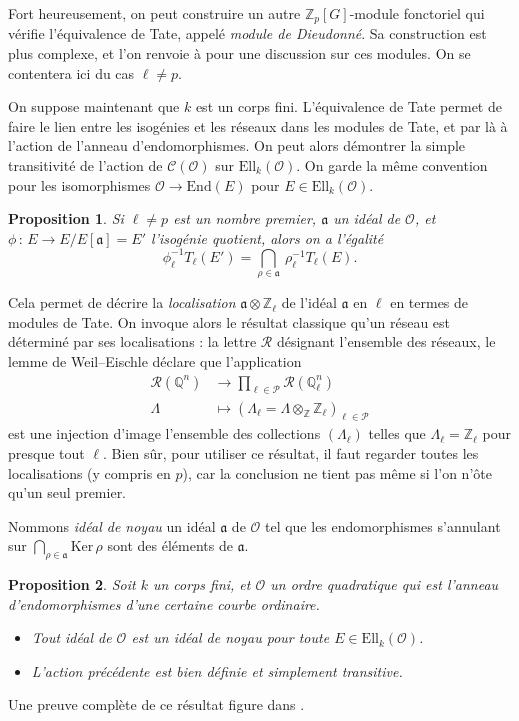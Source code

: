 \documentclass[11pt,a4paper]{article}
\newcommand{\Z}{\mathbb{Z}}
\newcommand{\Q}{\mathbb{Q}}
\renewcommand{\O}{\mathcal{O}}
\newcommand{\Cl}{\mathcal{C}}
\newcommand{\vers}{\longrightarrow}
\newcommand{\End}{\mathrm{End}}
\newcommand{\Ell}{\mathrm{Ell}}
\newcommand{\Ker}{\mathrm{Ker}\,}
\renewcommand{\frak}{\mathfrak}
\newcommand{\de}{\,:\,}
\renewcommand{\v}{\vspace{5mm}}
\newtheorem*{prop}{Proposition}
\theoremstyle{definition}
\begin{document}
Fort heureusement, on peut construire un autre $\Z_p[G]$-module fonctoriel qui vérifie l'équivalence de Tate, appelé \emph{module de Dieudonné}. Sa construction est plus complexe, et l'on renvoie à \cite{Waterhouse} pour une discussion sur ces modules. On se contentera ici du cas $\ell\neq p$.
\v

On suppose maintenant que $k$ est un corps fini. L'équivalence de Tate permet de faire le lien entre les isogénies et les réseaux dans les modules de Tate, et par là à l'action de l'anneau d'endomorphismes. On peut alors démontrer la simple transitivité de l'action de $\Cl(\O)$ sur $\Ell_k(\O)$. On garde la même convention pour les isomorphismes $\O\vers \End(E)$ pour $E\in\Ell_k(\O)$.

\begin{prop}
Si $\ell\neq p$ est un nombre premier, $\frak a$ un idéal de $\O$, et $\phi\de E\vers E/E[\frak a] = E'$ l'isogénie quotient, alors on a l'égalité
$$\phi_\ell^{-1} T_\ell(E') = \bigcap_{\rho\in\frak a}\ \rho_\ell^{-1} T_\ell(E) .$$
\end{prop}

Cela permet de décrire la \emph{localisation} $\frak a\otimes \Z_\ell$ de l'idéal $\frak a$ en $\ell$ en termes de modules de Tate. On invoque alors le résultat classique qu'un réseau est déterminé par ses localisations : la lettre $\mathcal{R}$ désignant l'ensemble des réseaux, le lemme de Weil--Eischle déclare que l'application
$$\begin{aligned}
\mathcal{R}(\Q^n) &\longrightarrow \prod_{\ell\in \mathcal{P}} \mathcal{R}(\Q_\ell^n) \\
\Lambda\ \ &\longmapsto (\Lambda_\ell = \Lambda\otimes_\Z \Z_\ell)_{\ell\in\mathcal{P}}
\end{aligned}$$
est une injection d'image l'ensemble des collections $(\Lambda_\ell)$ telles que $\Lambda_\ell = \Z_\ell$ pour presque tout $\ell$. Bien sûr, pour utiliser ce résultat, il faut regarder toutes les localisations (y compris en $p$), car la conclusion ne tient pas même si l'on n'ôte qu'un seul premier.

Nommons \emph{idéal de noyau} un idéal $\frak a$ de $\O$ tel que les endomorphismes s'annulant sur $\bigcap_{\rho\in \frak a} \Ker\rho$ sont des éléments de $\frak a$.

\begin{prop}
Soit $k$ un corps fini, et $\O$ un ordre quadratique qui est l'anneau d'endomorphismes d'une certaine courbe ordinaire.
\begin{itemize}
\item Tout idéal de $\O$ est un idéal de noyau pour toute $E\in \Ell_k(\O)$.
\item L'action précédente est bien définie et simplement transitive.
\end{itemize}
\end{prop}
Une preuve complète de ce résultat figure dans \cite{Waterhouse}.
\end{document}
